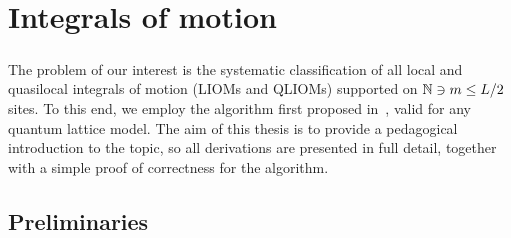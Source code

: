 \chapter{Integrals of motion}
\thispagestyle{chapterBeginStyle}

\paragraph{}The problem of our interest is the systematic classification of all local and quasilocal integrals of
motion (LIOMs and QLIOMs) supported on \(\mathbb{N} \ni m \leq L/2\) sites. To this end, we employ the algorithm first proposed
in~\textcite{Mierzejewski2015a}, valid for any quantum lattice model. The aim of this thesis is to provide a pedagogical introduction to the topic, 
so all derivations are presented in full detail, together with a simple proof of correctness for the algorithm.

\section{Preliminaries}

